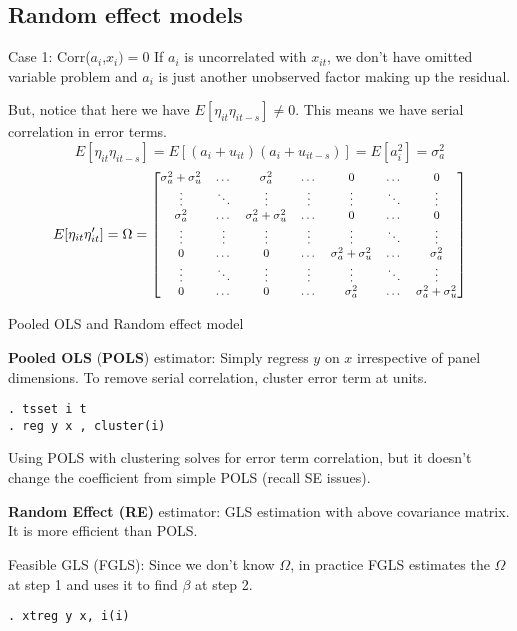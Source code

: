 \documentclass{beamer}
\begin{document}
\subsection{Random effect models}
\begin{frame}{Case 1: Corr($a_i$,$x_i)=0$}
If $a_i$ is uncorrelated with $x_{it}$, we don't have omitted variable problem and $a_i$ is just another unobserved factor making up the residual.\bigskip

But, notice that here we have $E[\eta_{it}\eta_{it-s}]\neq 0$. This means we have serial correlation in error terms.
\[E[\eta_{it}\eta_{it-s}]=E[(a_i+u_{it})(a_i+u_{it-s})]=E[a_i^2]=\sigma^2_a \]
\[E[\eta_{it} \eta_{it}']=\Omega=\footnotesize \left[\begin{matrix}
\sigma^2_{a}+\sigma^2_u & \dots & \sigma^2_{a}&\dots&0& \dots & 0\\
\vdots & \ddots & \vdots&\vdots & \vdots & \ddots&\vdots\\
\sigma^2_{a} & \dots & \sigma^2_{a}+\sigma^2_u&\dots&0&\dots&0\\
\vdots&\vdots&\vdots&\vdots&\vdots&\ddots&\vdots\\
0&\dots&0& \dots & \sigma^2_{a}+\sigma^2_u & \dots & \sigma^2_{a}\\
\vdots & \ddots & \vdots&\vdots & \vdots & \ddots&\vdots\\
0&\dots&0&\dots&\sigma^2_{a} & \dots & \sigma^2_{a}+\sigma^2_u\\
\end{matrix} \right] \]
\end{frame}

\begin{frame}{Pooled OLS and Random effect model}

\textbf{Pooled OLS} (\textbf{POLS}) estimator: Simply regress $y$ on $x$ irrespective of panel dimensions. To remove serial correlation, cluster error term at units.

\texttt{. tsset i t \\ . reg y x , cluster(i)}\bigskip

Using POLS with clustering solves for error term correlation, but it doesn't change the coefficient from simple POLS (recall SE issues).\medskip

\textbf{Random Effect (RE)} estimator: GLS estimation with above covariance matrix. It is more efficient than POLS. \medskip

{Feasible GLS (FGLS)}: Since we don't know $\Omega$, in practice FGLS estimates the $\hat{\Omega}$ at step 1 and uses it to find $\beta$ at step 2.

\texttt{. xtreg y x, i(i)}
\end{frame}
\end{document}
